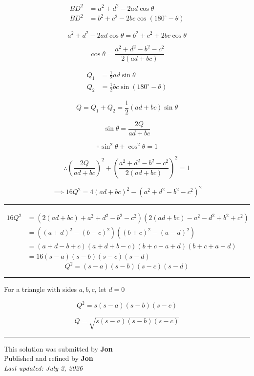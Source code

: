 \documentclass[12pt]{article}
\begin{document}
\newcommand{\ds}{\displaystyle}


\begin{align*}
BD^2&=a^2+d^2-2ad\cos\theta\\
BD^2&=b^2+c^2-2bc\cos(180^\circ-\theta)
\end{align*}


$$a^2+d^2-2ad\cos\theta=b^2+c^2+2bc\cos\theta$$

$$\boxed{\cos\theta=\frac{a^2+d^2-b^2-c^2}{2(ad+bc)}}$$

\begin{align*}
Q_1&=\frac12ad\sin\theta\\
Q_2&=\frac12bc\sin(180^\circ-\theta)
\end{align*}

$$Q=Q_1+Q_2=\frac12(ad+bc)\sin\theta$$

$$\boxed{\sin\theta=\frac{2Q}{ad+bc}}$$

$$\because\sin^2\theta+\cos^2\theta=1$$

$$\therefore \left(\frac{2Q}{ad+bc}\right)^2+\left(\frac{a^2+d^2-b^2-c^2}{2(ad+bc)}\right)^2=1$$

$$\implies \boxed{16Q^2=4(ad+bc)^2-(a^2+d^2-b^2-c^2)^2}$$

\bigskip\hrule\bigskip

\begin{align*}
16Q^2
&=\left(2(ad+bc)+a^2+d^2-b^2-c^2\right)\left(2(ad+bc)-a^2-d^2+b^2+c^2\right)\\
&=\left((a+d)^2-(b-c)^2\right)\left((b+c)^2-(a-d)^2\right)\\
&=(a+d-b+c)(a+d+b-c)(b+c-a+d)(b+c+a-d)\\
&=16(s-a)(s-b)(s-c)(s-d)
\end{align*}
$$\boxed{Q^2=(s-a)(s-b)(s-c)(s-d)}$$

\bigskip\hrule\bigskip

For a triangle with sides $\ds a,b,c$, let $\ds d=0$

$$Q^2=s(s-a)(s-b)(s-c)$$

$$Q=\sqrt{s(s-a)(s-b)(s-c)}$$

\bigskip
\hrule
\begin{center}
    This solution was submitted by \textbf{Jon}\\[4pt]
    Published and refined by \textbf{Jon}\\[8pt]
    \textit{Last updated: July 2, 2026}
\end{center}
\end{document}

